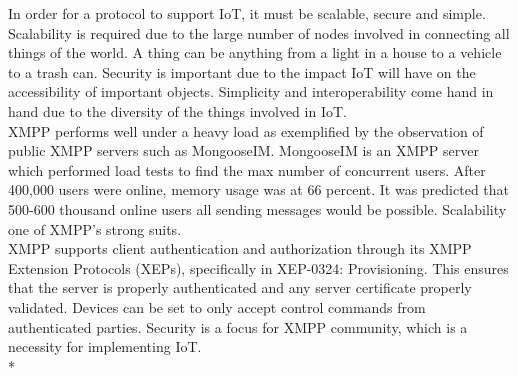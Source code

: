 In order for a protocol to support IoT, it must be scalable, secure and simple. Scalability is required due to the large number of nodes involved in connecting all things of the world. A thing can be anything from a light in a house to a vehicle to a trash can. Security is important due to the impact IoT will have on the accessibility of important objects. Simplicity and interoperability come hand in hand due to the diversity of the things involved in IoT.\\
XMPP performs well under a heavy load as exemplified by the observation of public XMPP servers such as MongooseIM. MongooseIM is an XMPP server which performed load tests to find the max number of concurrent users. After 400,000 users were online, memory usage was at 66 percent. It was predicted that 500-600 thousand online users all sending messages would be possible\cite{mongooeIM}. Scalability one of XMPP's strong suits.\\
XMPP supports client authentication and authorization through its XMPP Extension Protocols (XEPs), specifically in XEP-0324: Provisioning. This ensures that the server is properly authenticated and any server certificate properly validated. Devices can be set to only accept control commands from authenticated parties. Security is a focus for XMPP community, which is a necessity for implementing IoT.\\*
